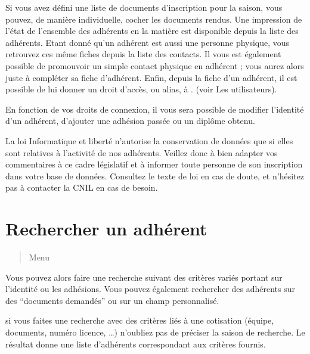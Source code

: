 \documentclass[a4paper,10pt,oneside,french]{sphinxmanual}
\begin{document}
Si vous avez défini une liste de documents d’inscription pour la saison, vous pouvez, de manière individuelle, cocher les documents rendus. Une impression de l’état de l’ensemble des adhérents en la matière est disponible depuis la liste des adhérents.
Etant donné qu’un adhérent est aussi une personne physique, vous retrouvez ces même fiches depuis la liste des contacts. Il vous est également possible de promouvoir un simple contact physique en adhérent ; vous aurez alors juste à compléter sa fiche d’adhérent.
Enfin, depuis la fiche d’un adhérent, il est possible de lui donner un droit d’accès, ou alias, à . (voir Les utilisateurs).

En fonction de vos droits de connexion, il vous sera possible de modifier l’identité d’un adhérent, d’ajouter une adhésion passée ou un diplôme obtenu.

\noindent{}

 La loi Informatique et liberté n’autorise la conservation de données que si elles sont relatives à l’activité de nos adhérents. Veillez donc à bien adapter vos commentaires à ce cadre législatif et à informer toute personne de son inscription dans votre base de données.
Consultez le texte de loi en cas de doute, et n’hésitez pas à contacter la CNIL en cas de besoin.


\section{Rechercher un adhérent}
\label{\detokenize{member/member_search:rechercher-un-adherent}}\label{\detokenize{member/member_search::doc}}\begin{quote}

Menu 
\end{quote}

\noindent{}

Vous pouvez alors faire une recherche suivant des critères variés portant sur l’identité ou les adhésions.
Vous pouvez également rechercher des adhérents sur des “documents demandés” ou sur un champ personnalisé.

 si vous faites une recherche avec des critères liés à une cotisation (équipe, documents, numéro licence, …) n’oubliez pas de préciser la saison de recherche. Le résultat donne une liste d’adhérents correspondant aux critères fournis.
\end{document}
